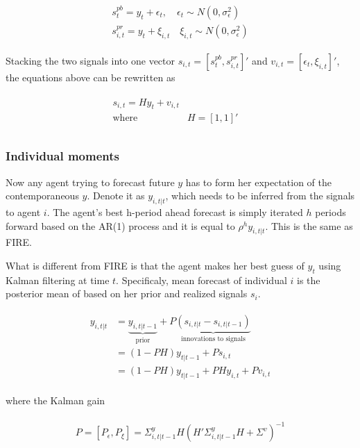 \documentclass[]{article}
\begin{document}
\begin{eqnarray}
\begin{aligned}
s^{pb}_t = y_t + \epsilon_t, \quad \epsilon_t \sim N(0,\sigma^2_\epsilon)\\ 
s^{pr}_{i,t} = y_t + \xi_{i,t} \quad \xi_{i,t} \sim N(0,\sigma^2_\epsilon)
\end{aligned}
\end{eqnarray}

Stacking the two signals into one vector $s_{i,t} = [s^{pb}_t,s^{pr}_{i,t}]'$ and $v_{i,t}= [\epsilon_t,\xi_{i,t}]'$, the equations above can be rewritten as 

\begin{eqnarray}
\begin{aligned}
s_{i,t} = H y_{t} + v_{i,t} \\
\text{where } & H=[1,1]' \quad \\
\end{aligned}
\end{eqnarray}


\subsubsection{Individual moments }

Now any agent trying to forecast future $y$ has to form her expectation of the contemporaneous $y$. Denote it as  $y_{i,t|t}$, which needs to be inferred from the signals to agent $i$. The agent's best h-period ahead forecast is simply iterated $h$ periods forward based on the AR(1) process and it is equal to $\rho^h y_{i,t|t}$. This is the same as FIRE.

What is different from FIRE is that the agent makes her best guess of $y_t$ using Kalman filtering at time $t$. Specificaly, mean forecast of individual $i$ is the posterior mean of based on her prior and realized signals $s_i$. 


\begin{eqnarray}
\begin{aligned}
y_{i,t|t}  
& =  \underbrace{y_{i,t|t-1}}_{\text{prior}} + P \underbrace {(s_{i,t|t}-s_{i,t|t-1})}_{\text{innovations to signals}} \\
& = (1-PH) y_{t|t-1} + Ps_{i,t} \\
& = (1-PH) y_{t|t-1} + PH y_{i,t} + P v_{i,t} 
\end{aligned}
\end{eqnarray}

where the Kalman gain  


\begin{eqnarray}
\begin{aligned}
 P = [P_\epsilon,P_\xi]= \Sigma^y_{i,t|t-1} H(H'\Sigma^y_{i,t|t-1} H + \Sigma^v)^{-1} 
 \end{aligned}
 \end{eqnarray}
 
\end{document}
